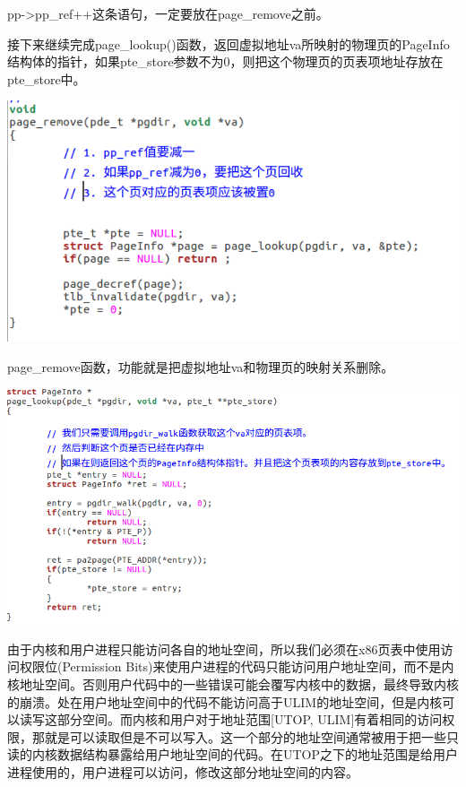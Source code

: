 \begin{ExerciseList}
      pp->pp\_ref++这条语句，一定要放在page\_remove之前。

      接下来继续完成page\_lookup()函数，返回虚拟地址va所映射的物理页的PageInfo结构体的指针，如果pte\_store参数不为0，则把这个物理页的页表项地址存放在pte\_store中。


      \includegraphics[width=6in]{figures/lab2/image48.png}

      page\_remove函数，功能就是把虚拟地址va和物理页的映射关系删除。

      \includegraphics[width=6in]{figures/lab2/image49.png}

  由于内核和用户进程只能访问各自的地址空间，所以我们必须在x86页表中使用访问权限位(Permission Bits)来使用户进程的代码只能访问用户地址空间，而不是内核地址空间。否则用户代码中的一些错误可能会覆写内核中的数据，最终导致内核的崩溃。处在用户地址空间中的代码不能访问高于ULIM的地址空间，但是内核可以读写这部分空间。而内核和用户对于地址范围[UTOP, ULIM]有着相同的访问权限，那就是可以读取但是不可以写入。这一个部分的地址空间通常被用于把一些只读的内核数据结构暴露给用户地址空间的代码。在UTOP之下的地址范围是给用户进程使用的，用户进程可以访问，修改这部分地址空间的内容。







\end{ExerciseList}
